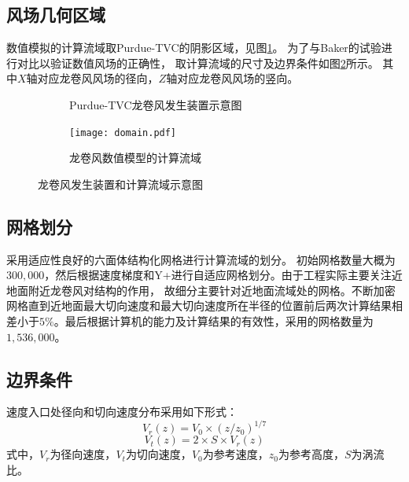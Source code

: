 \subsection{风场几何区域}
数值模拟的计算流域取Purdue-TVC的阴影区域，见图\ref{fig:Ward-TVC}。
为了与Baker\cite{baker1981boundary}的试验进行对比以验证数值风场的正确性，
取计算流域的尺寸及边界条件如图\ref{fig:tornado-domain}所示。
其中$X$轴对应龙卷风风场的径向，$Z$轴对应龙卷风风场的竖向。
\begin{figure}[!htbp]
	\begin{subfigure}[b]{0.5\textwidth}
		\centering
		
		\caption{Purdue-TVC龙卷风发生装置示意图}\label{fig:Ward-TVC}
	\end{subfigure}
	\begin{subfigure}[b]{0.5\textwidth}
		\centering
		\texttt{[image: domain.pdf]}
		\caption{龙卷风数值模型的计算流域}\label{fig:tornado-domain}
	\end{subfigure}
	\caption{龙卷风发生装置和计算流域示意图}\label{fig:TVC-domain}
\end{figure}

\subsection{网格划分}
采用适应性良好的六面体结构化网格进行计算流域的划分。
初始网格数量大概为$300,000$，然后根据速度梯度和Y+进行自适应网格划分\cite{fluent2015user}。由于工程实际主要关注近地面附近龙卷风对结构的作用，
故细分主要针对近地面流域处的网格。不断加密网格直到近地面最大切向速度和最大切向速度所在半径的位置前后两次计算结果相差小于$5\%$。最后根据计算机的能力及计算结果的有效性，采用的网格数量为$1,536,000$。


\subsection{边界条件}
速度入口处径向和切向速度分布采用如下形式：
\begin{equation}\label{eqn:Vr}
	V_r(z) = V_0 \times (z/z_0)^{1/7}
\end{equation}
\begin{equation}\label{eqn:Vt}
	V_t(z) = 2 \times S \times V_r(z)
\end{equation}
式中，$V_r$为径向速度，$V_t$为切向速度，$V_0$为参考速度，$z_0$为参考高度，$S$为涡流比。

